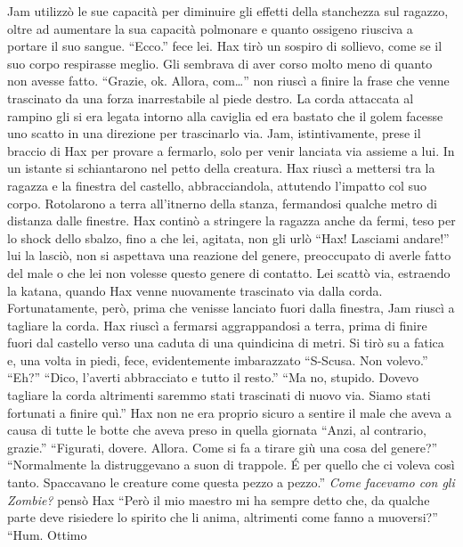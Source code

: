     Jam utilizzò le sue capacità per diminuire gli effetti della
    stanchezza sul ragazzo, oltre ad aumentare la sua capacità polmonare e
    quanto ossigeno riusciva a portare il suo sangue. ``Ecco.'' fece lei.
    Hax tirò un sospiro di sollievo, come se il suo corpo respirasse
    meglio. Gli sembrava di aver corso molto meno di quanto non avesse
    fatto. ``Grazie, ok. Allora, com\dots{}'' non riuscì a finire la frase
    che venne trascinato da una forza inarrestabile al piede destro. La
    corda attaccata al rampino gli si era legata intorno alla caviglia ed
    era bastato che il golem facesse uno scatto in una direzione per
    trascinarlo via. Jam, istintivamente, prese il braccio di Hax per
    provare a fermarlo, solo per venir lanciata via assieme a lui. In un
    istante si schiantarono nel petto della creatura. Hax riuscì a mettersi
    tra la ragazza e la finestra del castello, abbracciandola, attutendo l'impatto col suo
    corpo. Rotolarono a terra all'itnerno della stanza, fermandosi qualche
    metro di distanza dalle finestre. Hax continò a stringere la ragazza
    anche da fermi, teso per lo shock dello sbalzo, fino a che lei,
    agitata, non gli urlò ``Hax! Lasciami andare!'' lui la lasciò, non si
    aspettava una reazione del genere, preoccupato di averle fatto del
    male o che lei non volesse questo genere di contatto. Lei scattò via,
    estraendo la katana, quando Hax venne nuovamente trascinato via dalla
    corda. Fortunatamente, però, prima che venisse lanciato fuori dalla
    finestra, Jam riuscì a tagliare la corda. Hax riuscì a fermarsi
    aggrappandosi a terra, prima di finire fuori dal castello verso una
    caduta di una quindicina di metri. Si tirò su a fatica e, una volta in
    piedi, fece, evidentemente imbarazzato ``S-Scusa. Non volevo.'' ``Eh?''
    ``Dico, l'averti abbracciato e tutto il resto.'' ``Ma no, stupido.
    Dovevo tagliare la corda altrimenti saremmo stati trascinati di nuovo
    via. Siamo stati fortunati a finire quì.'' Hax non ne era proprio
    sicuro a sentire il male che aveva a causa di tutte le botte che aveva
    preso in quella giornata ``Anzi, al contrario, grazie.'' ``Figurati,
    dovere. Allora. Come si fa a tirare giù una cosa del genere?''
    ``Normalmente la distruggevano a suon di trappole. \'E per quello che
    ci voleva così tanto. Spaccavano le creature come questa pezzo a
    pezzo.'' \emph{Come facevamo con gli Zombie?} pensò Hax ``Però il mio
    maestro mi ha sempre detto che, da qualche parte deve risiedere lo
    spirito che li anima, altrimenti come fanno a muoversi?'' ``Hum. Ottimo
